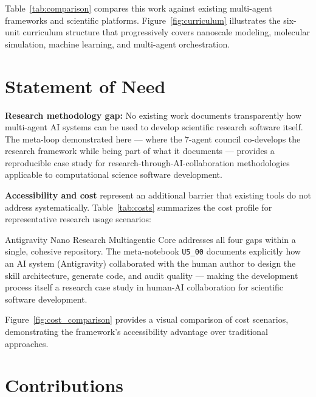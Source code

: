 \documentclass[11pt]{article}
\newcommand{\code}[1]{\texttt{#1}}
\begin{document}
Table~\ref{tab:comparison} compares this work against existing multi-agent frameworks and scientific platforms. Figure~\ref{fig:curriculum} illustrates the six-unit curriculum structure that progressively covers nanoscale modeling, molecular simulation, machine learning, and multi-agent orchestration.





\section{Statement of Need}

\textbf{Research methodology gap:} No existing work documents transparently how multi-agent AI systems can be used to develop scientific research software itself. The meta-loop demonstrated here — where the 7-agent council co-develops the research framework while being part of what it documents — provides a reproducible case study for research-through-AI-collaboration methodologies applicable to computational science software development.

\textbf{Accessibility and cost} represent an additional barrier that existing tools do not address systematically. Table~\ref{tab:costs} summarizes the cost profile for representative research usage scenarios:



Antigravity Nano Research Multiagentic Core addresses all four gaps within a single, cohesive repository. The meta-notebook \code{U5\_00} documents explicitly how an AI system (Antigravity) collaborated with the human author to design the skill architecture, generate code, and audit quality — making the development process itself a research case study in human-AI collaboration for scientific software development.

Figure~\ref{fig:cost_comparison} provides a visual comparison of cost scenarios, demonstrating the framework's accessibility advantage over traditional approaches.



\section{Contributions}
\end{document}
